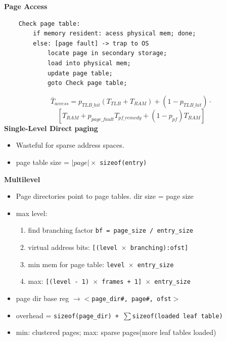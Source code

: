 \documentclass[8pt,twocolumn]{article}
\begin{document}
\textbf{Page Access}
\vspace{-0.6em}
\begin{lstlisting}
    Check page table:
        if memory resident: acess physical mem; done;
        else: [page fault] -> trap to OS
            locate page in secondary storage;
            load into physical mem;
            update page table;
            goto Check page table;
\end{lstlisting}
\vspace{-0.6em}
\[
\bar{T}_{access} = p_{TLB\_hit}(T_{TLB} + T_{RAM}) + (1 - p_{TLB\_hit}) \cdot\]
\[ \left[T_{RAM} + p_{page\_fault}T_{pf\_remedy} + (1 - p_{pf})T_{RAM}\right]\]
\vspace{-0.2em}
\textbf{Single-Level Direct paging}
\vspace{-0.6em}
\begin{itemize}
    \setlength{\itemsep}{0pt} %
    \setlength{\parskip}{0pt}
  \item Wasteful for sparse address spaces.
  \item page table size = $|page| \times$ \texttt{sizeof(entry)} 
\end{itemize}
\vspace{-0.6em}
\textbf{Multilevel}
\vspace{-0.6em}
\begin{itemize}
    \setlength{\itemsep}{0pt} %
    \setlength{\parskip}{0pt}
  \item Page directories point to page tables. dir size = page size
  \item max level: 
\vspace{-0.2em}
    \begin{enumerate}
      \setlength{\itemsep}{0pt} %
      \setlength{\parskip}{0pt}
      \item find branching factor \texttt{bf = page\_size / entry\_size}
      \item virtual address bits: \texttt{[(level $\times$ branching):ofst]}
      \item min mem for page table: \texttt{level $\times$ entry\_size}
      \item max: \texttt{[(level - 1) $\times$ frames + 1] $\times$ entry\_size}
    \end{enumerate}
\vspace{-0.2em}
  \item page dir base reg \texttt{$\rightarrow<$page\_dir\#, page\#, ofst$>$}
  \item overhead = \texttt{sizeof(page\_dir) + $\sum$sizeof(loaded leaf table)}
  \item min: clustered pages; max: sparse pages(more leaf tables loaded)
\end{itemize}
\end{document}
